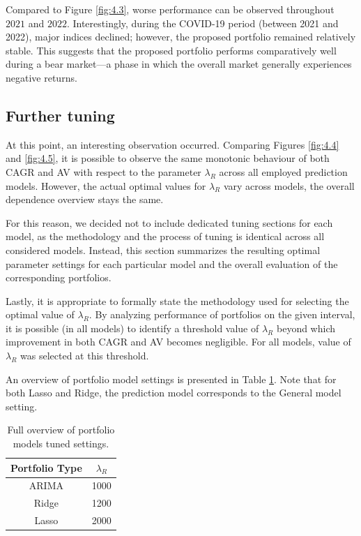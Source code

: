 Compared to Figure \ref{fig:4.3}, worse performance can be observed throughout $2021$ and $2022$. Interestingly, during the COVID-19 period (between 2021 and 2022), major indices declined; however, the proposed portfolio remained relatively stable. This suggests that the proposed portfolio performs comparatively well during a bear market—a phase in which the overall market generally experiences negative returns.

\subsection{Further tuning}
At this point, an interesting observation occurred. Comparing Figures \ref{fig:4.4} and \ref{fig:4.5}, it is possible to observe the same monotonic behaviour of both CAGR and AV
with respect to the parameter $\lambda_R$ across all employed prediction models. However, the actual optimal values for $\lambda_R$ vary across models, the overall dependence overview stays the same.

For this reason, we decided not to include dedicated tuning sections for each model, as the methodology and the process of tuning is identical across all considered models. Instead, this section
summarizes the resulting optimal parameter settings for each particular model and the overall evaluation of the corresponding portfolios.

Lastly, it is appropriate to formally state the methodology used for selecting the optimal value of $\lambda_R$. By analyzing performance of portfolios on the given interval,
it is possible (in all models) to identify a threshold value of $\lambda_R$ beyond which improvement in both CAGR and AV becomes negligible. For all models, value of $\lambda_R$ was selected at this threshold.

An overview of portfolio model settings is presented in Table \ref{tab:settings}. Note that for both Lasso and Ridge, the prediction model corresponds to the General model setting.

\begin{table}[H]
\centering
\begin{tabular}{|c|c|}
\hline
\textbf{Portfolio Type} & $\lambda_R$ \\
\hline
ARIMA & 1000 \\
\hline
Ridge & 1200 \\
\hline
Lasso & 2000 \\
\hline
\end{tabular}
\caption{\centering Full overview of portfolio models tuned settings.}
\label{tab:settings}
\end{table}

